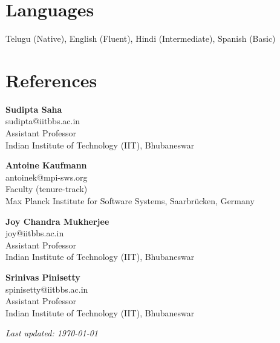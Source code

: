 \documentclass[10pt, a4paper]{article}
\newcommand{\TablePad}{\vspace{-0.4cm}}
\begin{document}
\vspace*{-.2\baselineskip}

\section{Languages}
Telugu (Native), English (Fluent), Hindi (Intermediate), Spanish (Basic)

\vspace*{-.2\baselineskip}

\section{References}
\begin{minipage}[t]{0.5\textwidth}
  \textbf{Sudipta Saha} \\
  sudipta@iitbbs.ac.in \\
  Assistant Professor \\
  Indian Institute of Technology (IIT), Bhubaneswar \\
\end{minipage}
\begin{minipage}[t]{0.5\textwidth}
  \textbf{Antoine Kaufmann} \\
  antoinek@mpi-sws.org \\
  Faculty (tenure-track)\\ 
  Max Planck Institute for Software Systems, Saarbrücken, Germany \\
\end{minipage}
\vspace*{\baselineskip}
\vspace*{\baselineskip}
\begin{minipage}[t]{0.5\textwidth}
  \textbf{Joy Chandra Mukherjee} \\
  joy@iitbbs.ac.in \\
  Assistant Professor \\
  Indian Institute of Technology (IIT), Bhubaneswar \\
\end{minipage}
\begin{minipage}[t]{0.5\textwidth}
  \textbf{Srinivas Pinisetty} \\
  spinisetty@iitbbs.ac.in \\
  Assistant Professor\\ 
  Indian Institute of Technology (IIT), Bhubaneswar \\
\end{minipage}



\vfill
\textit{Last updated: \monthyear\today}
\end{document}

